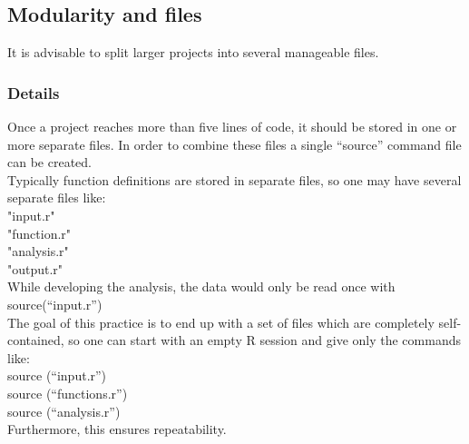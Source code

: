 \documentclass[12pt,a4paper]{article}
\theoremstyle{regla}
\theoremstyle{remark}
\theoremstyle{definition}
\theoremstyle{nonumberbreak}
\begin{document}
\subsection{Modularity and files}
\begin{fbox}
\begin{minipage}{0.97\textwidth}
It is advisable to split larger projects into several manageable files. 
\end{minipage}
\end{fbox}
\subsubsection{Details}
Once a project reaches more than five lines of code, it should be stored in one or more separate files. In order to combine these files a single “source” command file can be created.\\

Typically function definitions are stored in separate files, so one may have several separate files like:\\

    "input.r" \\
    "function.r" \\
    "analysis.r" \\
    "output.r" \\

While developing the analysis, the data would only be read once with\\

    source(“input.r”) \\

The goal of this practice is to end up with a set of files which are completely self-contained, so one can start with an empty R session and give only the commands like:\\

    source (“input.r”) \\
    source (“functions.r”) \\
    source (“analysis.r”)\\ 

Furthermore, this ensures repeatability. 
\end{document}
